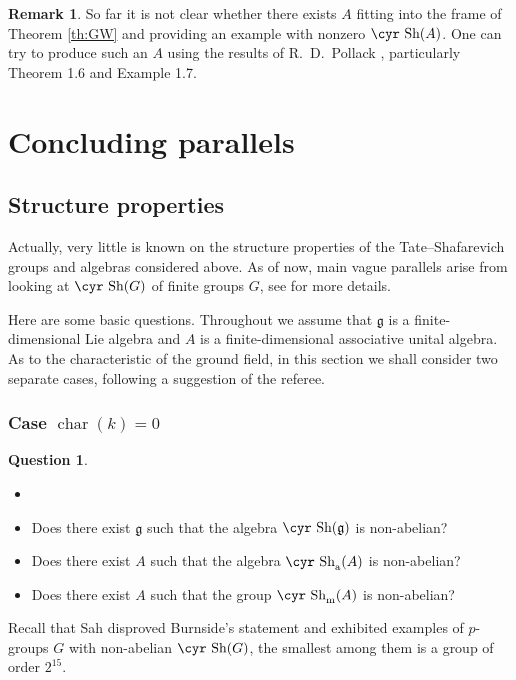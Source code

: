 \documentclass[11pt,reqno]{amsart}
\numberwithin{equation}{section}
\theoremstyle{definition}
\newtheorem{question}[theorem]{Question}
\newtheorem{remark}[theorem]{Remark}
\newcommand{\ch}{{\operatorname{char}}}
\def\Sha{\text{\cyr Sh}}
\def\g{\mathfrak g}
\begin{document}
\begin{remark}
So far it is not clear whether there exists $A$ fitting into the frame
of Theorem \ref{th:GW} and providing an example with nonzero $\Sha (A)$.
One can try to produce such an $A$ using the results of R.~D.~Pollack \cite{Po}, particularly
Theorem 1.6 and Example 1.7.
\end{remark}

\section{Concluding parallels} \label{sec:par}

\subsection{Structure properties}
Actually, very little is known on the structure properties of the Tate--Shafarevich groups and
algebras considered above. As of now, main vague parallels arise from looking at $\Sha(G)$ of
finite groups $G$, see \cite{Ku2} for more details. %

Here are some basic questions. Throughout we assume that $\g$ is a finite-dimensional Lie algebra and
$A$ is a finite-dimensional associative unital algebra. As to the characteristic of the ground field,
in this section we shall consider two separate cases, following a suggestion of the referee.

\subsubsection{Case $\ch (k)=0$}

\begin{question}
\begin{itemize}
\item[]
\item[(i)] Does there exist $\g$ such that the algebra $\Sha (\g)$ is non-abelian?
\item[(ii)] Does there exist $A$ such that the algebra $\Sha_{\rm{a}}(A)$ is non-abelian?
\item[(iii)] Does there exist $A$ such that the group $\Sha_{\rm{m}}(A)$ is non-abelian?
\end{itemize}
\end{question}

Recall that Sah \cite{Sah} disproved Burnside's statement \cite{Bur2} and exhibited examples of $p$-groups $G$ with
non-abelian $\Sha (G)$, the smallest among them is a group of order $2^{15}$.
\end{document}
